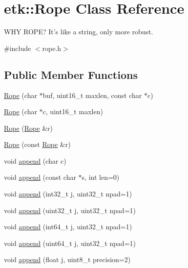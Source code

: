 \hypertarget{classetk_1_1_rope}{\section{etk\-:\-:Rope Class Reference}
\label{classetk_1_1_rope}
}


W\-H\-Y R\-O\-P\-E? It's like a string, only more robust.  




{\ttfamily \#include $<$rope.\-h$>$}

\subsection*{Public Member Functions}
\begin{DoxyCompactItemize}
\item 
\hyperlink{classetk_1_1_rope_a33aa2dfe2869e23980903fee0668b674}{Rope} (char $\ast$buf, uint16\-\_\-t maxlen, const char $\ast$c)
\item 
\hyperlink{classetk_1_1_rope_ad224685194f6f21c927f1d1be208d79a}{Rope} (char $\ast$c, uint16\-\_\-t maxlen)
\item 
\hyperlink{classetk_1_1_rope_a6ae86cdd3393624aea5f371bc228b498}{Rope} (\hyperlink{classetk_1_1_rope}{Rope} \&r)
\item 
\hyperlink{classetk_1_1_rope_a544ef8eb56d1a6146758cede8f57574e}{Rope} (const \hyperlink{classetk_1_1_rope}{Rope} \&r)
\item 
void \hyperlink{classetk_1_1_rope_aac9777d9693754133a0f468e2a2dc1a8}{append} (char c)
\item 
void \hyperlink{classetk_1_1_rope_aa2afc9a657364e8bdd40776bbe418dac}{append} (const char $\ast$s, int len=0)
\item 
void \hyperlink{classetk_1_1_rope_a3b9626a06a5369c8c4b39506b50595f6}{append} (int32\-\_\-t j, uint32\-\_\-t npad=1)
\item 
void \hyperlink{classetk_1_1_rope_a67aecd50b3a798e8ef13a2c54dd813b0}{append} (uint32\-\_\-t j, uint32\-\_\-t npad=1)
\item 
void \hyperlink{classetk_1_1_rope_ab90be49023f6a4a27b8a5d37c6a01fed}{append} (int64\-\_\-t j, uint32\-\_\-t npad=1)
\item 
void \hyperlink{classetk_1_1_rope_a61f942a8ce7330d1ca3a4c60fe1a16cf}{append} (uint64\-\_\-t j, uint32\-\_\-t npad=1)
\item 
void \hyperlink{classetk_1_1_rope_af8080a5e841f7c787a638faf3de9702c}{append} (float j, uint8\-\_\-t precision=2)
\item 

\end{DoxyCompactItemize}
